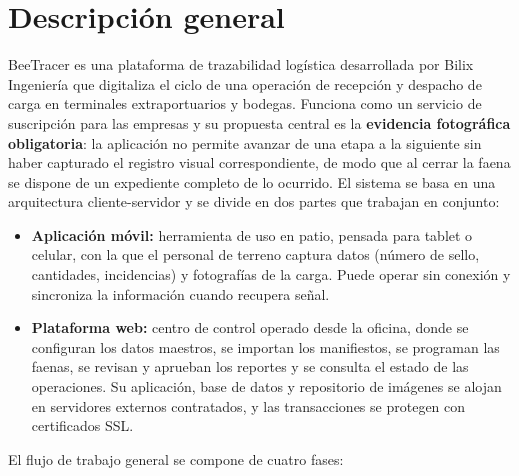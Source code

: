 \chapter{Descripción general}
\label{cap:descripcion}

BeeTracer es una plataforma de trazabilidad logística desarrollada por Bilix Ingeniería que
digitaliza el ciclo de una operación de recepción y despacho de carga en terminales extraportuarios
y bodegas. Funciona como un servicio de suscripción para las empresas y su propuesta central es la
\textbf{evidencia fotográfica obligatoria}: la aplicación no permite avanzar de una etapa a la
siguiente sin haber capturado el registro visual correspondiente, de modo que al cerrar la faena se
dispone de un expediente completo de lo ocurrido. El sistema se basa en una arquitectura
cliente-servidor y se divide en dos partes que trabajan en conjunto:

\begin{itemize}
    \item \textbf{Aplicación móvil:} herramienta de uso en patio, pensada para tablet o celular,
          con la que el personal de terreno captura datos (número de sello, cantidades,
          incidencias) y fotografías de la carga. Puede operar sin conexión y sincroniza la
          información cuando recupera señal.
    \item \textbf{Plataforma web:} centro de control operado desde la oficina, donde se configuran
          los datos maestros, se importan los manifiestos, se programan las faenas, se revisan y
          aprueban los reportes y se consulta el estado de las operaciones. Su aplicación, base de
          datos y repositorio de imágenes se alojan en servidores externos contratados, y las
          transacciones se protegen con certificados SSL.
\end{itemize}

El flujo de trabajo general se compone de cuatro fases:

